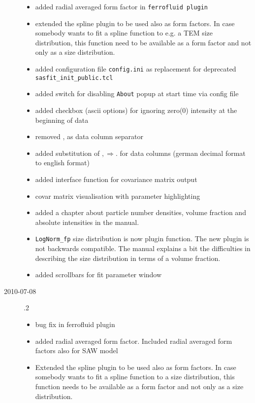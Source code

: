 \begin{description}
\begin{itemize}
        \item added radial averaged form factor in \texttt{ferrofluid plugin}
        \item extended the spline plugin to be used also as form factors.
            In case somebody wants to fit a spline function to e.g. a TEM size distribution,
            this function need to be available as a form factor and not only as a size
            distribution.
        \item added configuration file \texttt{config.ini} as replacement for
            deprecated \texttt{sasfit\_init\_public.tcl}
        \item added switch for disabling \texttt{About} popup at start time via config file
        \item added checkbox (ascii options) for ignoring zero(0) intensity at the beginning
                of data
        \item removed , as data column separator
        \item added substitution of $, \Rightarrow .$   for data columns
                (german decimal format to english format)
        \item added interface function for covariance matrix output
        \item covar matrix visualisation with parameter highlighting
        \item added a chapter about particle number densities, volume fraction
            and absolute intensities in the manual.
        \item \texttt{LogNorm\_fp} size distribution is now plugin function.
            The new plugin is not backwards compatible.
            The manual explains a bit the difficulties in describing the size distribution
            in terms of a volume fraction.
        \item added scrollbars for fit parameter window
        \end{itemize}
    \item[2010-07-08] .2
        \begin{itemize}
        \item bug fix in ferrofluid plugin
        \item added radial averaged form factor. Included radial averaged form factors also for SAW model
        \item Extended the spline plugin to be used also as form factors. In case somebody wants to fit a spline function to a size distribution, this function needs to be available as a form factor and not only as a size distribution.

\end{itemize}
\end{description}
